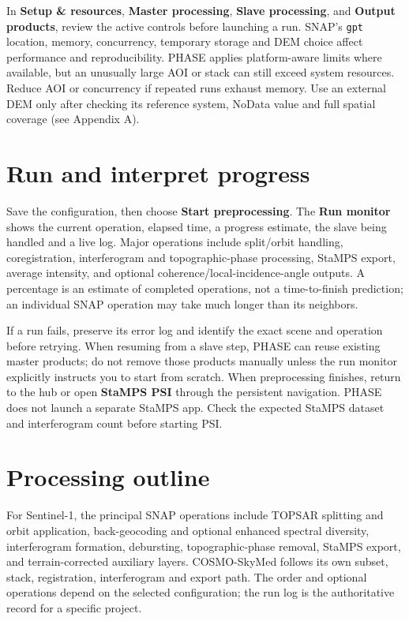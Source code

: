 In \textbf{Setup \& resources}, \textbf{Master processing}, \textbf{Slave processing}, and \textbf{Output products}, review the active controls before launching a run. SNAP's \texttt{gpt} location, memory, concurrency, temporary storage and DEM choice affect performance and reproducibility. PHASE applies platform-aware limits where available, but an unusually large AOI or stack can still exceed system resources. Reduce AOI or concurrency if repeated runs exhaust memory. Use an external DEM only after checking its reference system, NoData value and full spatial coverage (see Appendix A).

\section{Run and interpret progress}
Save the configuration, then choose \textbf{Start preprocessing}. The \textbf{Run monitor} shows the current operation, elapsed time, a progress estimate, the slave being handled and a live log. Major operations include split/orbit handling, coregistration, interferogram and topographic-phase processing, StaMPS export, average intensity, and optional coherence/local-incidence-angle outputs. A percentage is an estimate of completed operations, not a time-to-finish prediction; an individual SNAP operation may take much longer than its neighbors.

If a run fails, preserve its error log and identify the exact scene and operation before retrying. When resuming from a slave step, PHASE can reuse existing master products; do not remove those products manually unless the run monitor explicitly instructs you to start from scratch. When preprocessing finishes, return to the hub or open \textbf{StaMPS PSI} through the persistent navigation. PHASE does not launch a separate StaMPS app. Check the expected StaMPS dataset and interferogram count before starting PSI.

\section{Processing outline}
For Sentinel-1, the principal SNAP operations include TOPSAR splitting and orbit application, back-geocoding and optional enhanced spectral diversity, interferogram formation, debursting, topographic-phase removal, StaMPS export, and terrain-corrected auxiliary layers. COSMO-SkyMed follows its own subset, stack, registration, interferogram and export path. The order and optional operations depend on the selected configuration; the run log is the authoritative record for a specific project.

